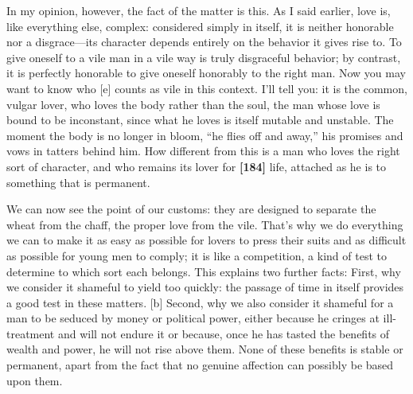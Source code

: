 In my opinion, however, the fact of the matter is this. As I said
earlier, love is, like everything else, complex: considered simply in
itself, it is neither honorable nor a disgrace---its character depends
entirely on the behavior it gives rise to. To give oneself to a vile man
in a vile way is truly disgraceful behavior; by contrast, it is
perfectly honorable to give oneself honorably to the right man. Now you
may want to know who {[}e{]} counts as vile in this context. I'll tell
you: it is the common, vulgar lover, who loves the body rather than the
soul, the man whose love is bound to be inconstant, since what he loves
is itself mutable and unstable. The moment the body is no longer in
bloom, “he flies off and
away,” his promises
and vows in tatters behind him. How different from this is a man who
loves the right sort of character, and who remains its lover for
{\bf {[}184{]}} life, attached as he is to something that is permanent.

We can now see the point of our customs: they are designed to separate
the wheat from the chaff, the proper love from the vile. That's why we
do everything we can to make it as easy as possible for lovers to press
their suits and as difficult as possible for young men to comply; it is
like a competition, a kind of test to determine to which sort each
belongs. This explains two further facts: First, why we consider it
shameful to yield too quickly: the passage of time in itself provides a
good test in these matters. {[}b{]} Second, why we also consider it
shameful for a man to be seduced by money or political power, either
because he cringes at ill-treatment and will not endure it or because,
once he has tasted the benefits of wealth and power, he will not rise
above them. None of these benefits is stable or permanent, apart from
the fact that no genuine affection can possibly be based upon them.

